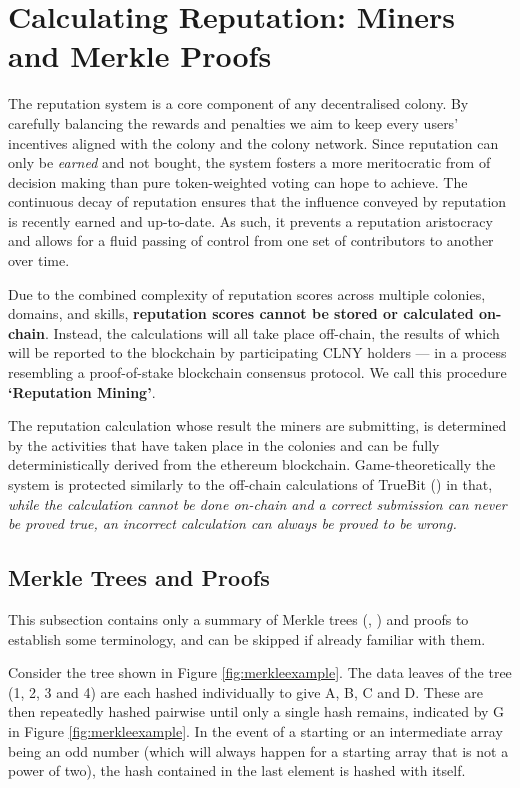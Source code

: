 
\section{Calculating Reputation: Miners and Merkle Proofs}\label{sec:reputationmining}
The reputation system is a core component of any decentralised colony. By carefully balancing the rewards and penalties we aim to keep every users' incentives aligned with the colony and the colony network. Since reputation can only be \emph{earned} and not bought, the system fosters a more meritocratic from of decision making than pure token-weighted voting can hope to achieve. The continuous decay of reputation ensures that the influence conveyed by reputation is recently earned and up-to-date. As such, it prevents a reputation aristocracy and allows for a fluid passing of control from one set of contributors to another over time.


Due to the combined complexity of reputation scores across multiple colonies, domains, and skills,
\textbf{reputation scores cannot be stored or calculated on-chain}. Instead, the calculations will all take place off-chain, the results of which will be reported to the blockchain by participating CLNY holders --- in a process resembling a proof-of-stake blockchain consensus protocol. We call this procedure \textbf{`Reputation Mining'}.

The reputation calculation whose result the miners are submitting, is determined by the activities that have taken place in the colonies and can be fully deterministically derived from the ethereum blockchain. Game-theoretically the system is protected similarly to the off-chain calculations of TrueBit (\cite{TruebitWhitepaper}) in that, \emph{while the calculation cannot be done on-chain and a correct submission can never be proved true, an incorrect calculation can always be proved to be wrong.}


\subsection{Merkle Trees and Proofs}\label{sec:merkle-summary}
This subsection contains only a summary of Merkle trees (\cite{MerkleTrees}, \cite{MerkleInEthereum}) and proofs to establish some terminology, and can be skipped if already familiar with them.

Consider the tree shown in Figure \ref{fig:merkleexample}. The data leaves of the tree (1, 2, 3 and 4) are each hashed individually to give A, B, C and D. These are then repeatedly hashed pairwise until only a single hash remains, indicated by G in Figure \ref{fig:merkleexample}. In the event of a starting or an intermediate array being an odd number (which will always happen for a starting array that is not a power of two), the hash contained in the last element is hashed with itself. 

